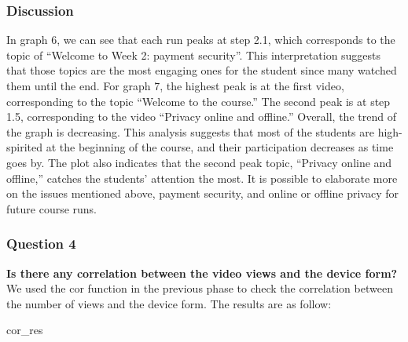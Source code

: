 \documentclass[12pt,]{article}
\newenvironment{Shaded}{\begin{snugshade}}{\end{snugshade}}
\newcommand{\NormalTok}[1]{#1}
\begin{document}
\hypertarget{discussion-2}{%
\subsubsection{Discussion}\label{discussion-2}}

In graph 6, we can see that each run peaks at step 2.1, which
corresponds to the topic of ``Welcome to Week 2: payment security''.
This interpretation suggests that those topics are the most engaging
ones for the student since many watched them until the end. For graph 7,
the highest peak is at the first video, corresponding to the topic
``Welcome to the course.'' The second peak is at step 1.5, corresponding
to the video ``Privacy online and offline.'' Overall, the trend of the
graph is decreasing. This analysis suggests that most of the students
are high-spirited at the beginning of the course, and their
participation decreases as time goes by. The plot also indicates that
the second peak topic, ``Privacy online and offline,'' catches the
students' attention the most. It is possible to elaborate more on the
issues mentioned above, payment security, and online or offline privacy
for future course runs.

\hypertarget{question-4-1}{%
\subsubsection{Question 4}\label{question-4-1}}

\textbf{Is there any correlation between the video views and the device
form?}\\
\hfill\break We used the cor function in the previous phase to check the
correlation between the number of views and the device form. The results
are as follow:

\tiny

\begin{Shaded}
\begin{Highlighting}[]
\NormalTok{cor\_res}
\end{Highlighting}
\end{Shaded}
\end{document}
